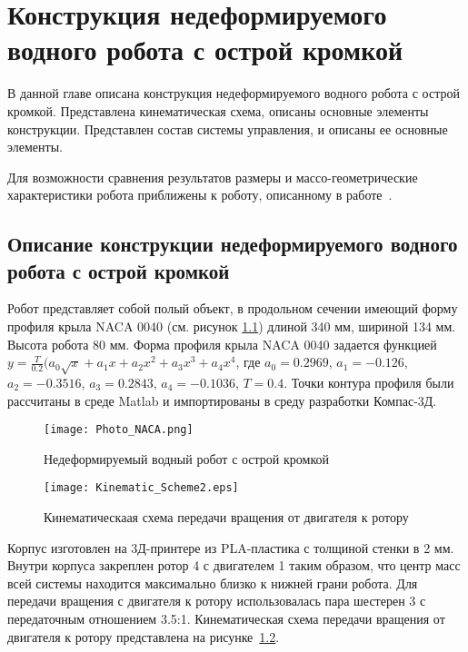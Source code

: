 \chapter{Конструкция недеформируемого водного робота с острой кромкой}\label{ch:ch5}

В данной главе описана конструкция недеформируемого водного робота с острой кромкой. Представлена кинематическая схема, описаны основные элементы конструкции. Представлен состав системы управления, и описаны ее основные элементы.

Для возможности сравнения результатов размеры и массо-геометрические характеристики робота приближены к роботу, описанному в работе~\cite{Pollard_Tallapragada_2016}.

\section{Описание конструкции недеформируемого водного робота с острой кромкой}

Робот представляет собой полый объект, в продольном сечении имеющий форму профиля крыла NACA 0040 (см. рисунок \ref{Photo_NACA}) длиной 340 мм, шириной 134 мм. Высота робота 80 мм. Форма профиля крыла NACA 0040 задается функцией 
$ y = \frac{T}{0.2}(a_0\sqrt{x} + a_1x + a_2x^2 + a_3x^3 + a_4x^4 $, где $a_0=0.2969$, $a_1=-0.126$, $a_2=-0.3516$, $a_3=0.2843$, $a_4=-0.1036$, $T=0.4$. Точки контура профиля были рассчитаны в среде Matlab и импортированы в среду разработки Компас-3Д.	

\begin{figure}[h]
	\centering
	\texttt{[image: Photo\_NACA.png]}%
	\caption{Недеформируемый водный робот с острой кромкой}
	\label{Photo_NACA}
\end{figure}

\begin{figure}[h]
	\centering
	\texttt{[image: Kinematic\_Scheme2.eps]}%
	\caption{Кинематическаая схема передачи вращения от двигателя к ротору}
	\label{kinemSchemeNACA}
\end{figure}

Корпус изготовлен на 3Д-принтере из PLA-пластика с толщиной стенки в 2 мм. Внутри корпуса закреплен ротор 4 с двигателем 1 таким образом, что центр масс всей системы находится максимально близко к нижней грани робота. Для передачи вращения с двигателя к ротору использовалась пара шестерен 3 с передаточным отношением 3.5:1. Кинематическая схема передачи вращения от двигателя к ротору представлена на рисунке~\ref{kinemSchemeNACA}.



